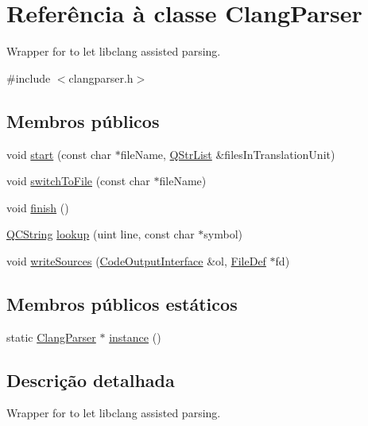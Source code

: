 \hypertarget{class_clang_parser}{\section{Referência à classe Clang\-Parser}
\label{class_clang_parser}
}


Wrapper for to let libclang assisted parsing.  




{\ttfamily \#include $<$clangparser.\-h$>$}

\subsection*{Membros públicos}
\begin{DoxyCompactItemize}
\item 
void \hyperlink{class_clang_parser_af7c25c56f58f21484e4ad43fd4a73554}{start} (const char $\ast$file\-Name, \hyperlink{class_q_str_list}{Q\-Str\-List} \&files\-In\-Translation\-Unit)
\item 
void \hyperlink{class_clang_parser_aca4c0e995b2d13db218e8cd378a929f1}{switch\-To\-File} (const char $\ast$file\-Name)
\item 
void \hyperlink{class_clang_parser_a6dfe1abe0d1eb3ddc1ca081de98b5342}{finish} ()
\item 
\hyperlink{class_q_c_string}{Q\-C\-String} \hyperlink{class_clang_parser_ad22e9db2f4590b9883b6b01080aad2f7}{lookup} (uint line, const char $\ast$symbol)
\item 
void \hyperlink{class_clang_parser_a63a48a31a772ed04d957f41d16ee439e}{write\-Sources} (\hyperlink{class_code_output_interface}{Code\-Output\-Interface} \&ol, \hyperlink{class_file_def}{File\-Def} $\ast$fd)
\end{DoxyCompactItemize}
\subsection*{Membros públicos estáticos}
\begin{DoxyCompactItemize}
\item 
static \hyperlink{class_clang_parser}{Clang\-Parser} $\ast$ \hyperlink{class_clang_parser_ae995ee43964e9a2d42e036a8b7c08094}{instance} ()
\end{DoxyCompactItemize}


\subsection{Descrição detalhada}
Wrapper for to let libclang assisted parsing. 


